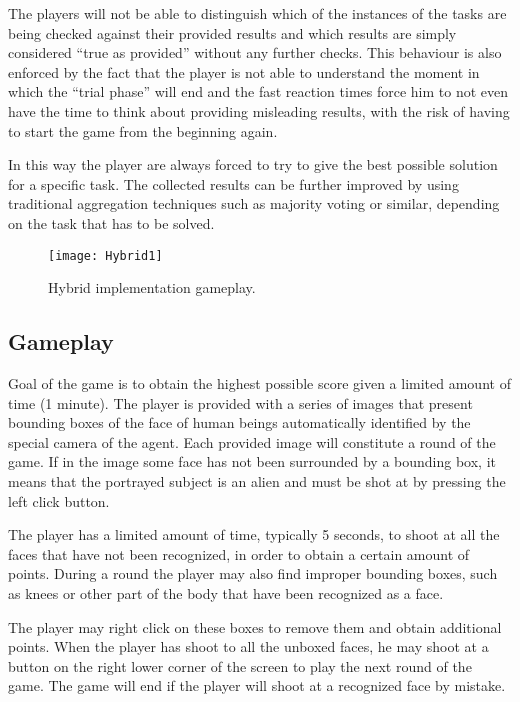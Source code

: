 The players will not be able to distinguish which of the instances of the tasks
are being checked against their provided results and which results are simply
considered “true as provided” without any further checks. This behaviour is also
enforced by the fact that the player is not able to understand the moment in which
the “trial phase” will end and the fast reaction times force him to not even have
the time to think about providing misleading results, with the risk of having to
start the game from the beginning again.

In this way the player are always forced to try to give the best possible solution
for a specific task. The collected results can be further improved by using
traditional aggregation techniques such as majority voting or similar, depending
on the task that has to be solved.

\begin{figure}[htb]
    \centering
    \texttt{[image: Hybrid1]}
    \caption{Hybrid implementation gameplay.}
    \label{fig:Hybrid2}
\end{figure}

\subsection{Gameplay}
Goal of the game is to obtain the highest possible score given a limited amount
of time (1 minute). The player is provided with a series of images that present
bounding boxes of the face of human beings automatically identified by the special
camera of the agent. Each provided image will constitute a round of the game. If
in the image some face has not been surrounded by a bounding box, it means that
the portrayed subject is an alien and must be shot at by pressing the left click
button.

The player has a limited amount of time, typically 5 seconds, to shoot at all the
faces that have not been recognized, in order to obtain a certain amount of points.
During a round the player may also find improper bounding boxes, such as knees or
other part of the body that have been recognized as a face.

The player may right click on these boxes to remove them and obtain additional
points. When the player has shoot to all the unboxed faces, he may shoot at a
button on the right lower corner of the screen to play the next round of the game.
The game will end if the player will shoot at a recognized face by mistake.

